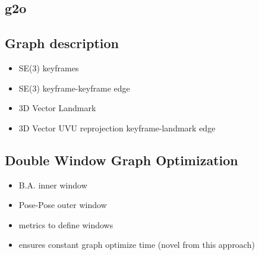 \subsection{g2o}
\subsection{Graph description}
\begin{itemize}
\itemsep0em
 \item SE(3) keyframes
 \item SE(3) keyframe-keyframe edge
 \item 3D Vector Landmark
 \item 3D Vector UVU reprojection keyframe-landmark edge
\end{itemize}

\subsection{Double Window Graph Optimization}
\begin{itemize}
\itemsep0em
 \item B.A. inner window
 \item Pose-Pose outer window
 \item metrics to define windows
 \item ensures constant graph optimize time (novel from this approach)
\end{itemize}
